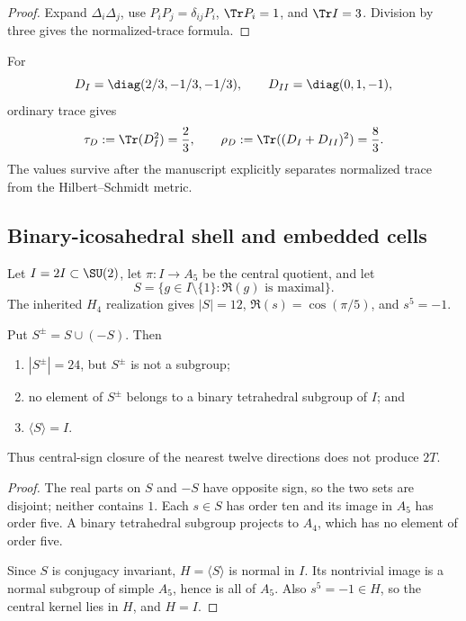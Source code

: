 \documentclass[12pt,a4paper]{article}
\begin{document}
\begin{proof}
Expand \(\Delta_i\Delta_j\), use
\(P_iP_j=\delta_{ij}P_i\), \(\Tr P_i=1\), and \(\Tr I=3\).  Division by
three gives the normalized-trace formula.
\end{proof}

\begin{corollary}
\label{p6:cor:a2-invariants}
For
\[
D_I=\diag(2/3,-1/3,-1/3),
\qquad
D_{II}=\diag(0,1,-1),
\]
ordinary trace gives
\[
\tau_D:=\Tr(D_I^2)=\frac23,
\qquad
\rho_D:=\Tr((D_I+D_{II})^2)=\frac83.
\]
The values survive after the manuscript explicitly separates normalized
trace from the Hilbert--Schmidt metric.
\end{corollary}

\subsection{Binary-icosahedral shell and embedded cells}
\label{p6:sec:icosahedral-cells}

Let \(I=2I\subset\SU(2)\), let \(\pi:I\to A_5\) be the central quotient,
and let
\[
S=\{g\in I\setminus\{1\}:\Re(g)\text{ is maximal}\}.
\]
The inherited \(H_4\) realization gives \(|S|=12\),
\(\Re(s)=\cos(\pi/5)\), and \(s^5=-1\).

\begin{theorem}
\label{p6:thm:nearest-shell-no-go}
Put \(S^\pm=S\cup(-S)\).  Then
\begin{enumerate}[label=(\roman*),leftmargin=2em]
\item \(|S^\pm|=24\), but \(S^\pm\) is not a subgroup;
\item no element of \(S^\pm\) belongs to a binary tetrahedral subgroup of
\(I\); and
\item \(\langle S\rangle=I\).
\end{enumerate}
Thus central-sign closure of the nearest twelve directions does not produce
\(2T\).
\end{theorem}

\begin{proof}
The real parts on \(S\) and \(-S\) have opposite sign, so the two sets are
disjoint; neither contains \(1\).  Each \(s\in S\) has order ten and its
image in \(A_5\) has order five.  A binary tetrahedral subgroup projects to
\(A_4\), which has no element of order five.

Since \(S\) is conjugacy invariant, \(H=\langle S\rangle\) is normal in
\(I\).  Its nontrivial image is a normal subgroup of simple \(A_5\), hence
is all of \(A_5\).  Also \(s^5=-1\in H\), so the central kernel lies in
\(H\), and \(H=I\).
\end{proof}
\end{document}
